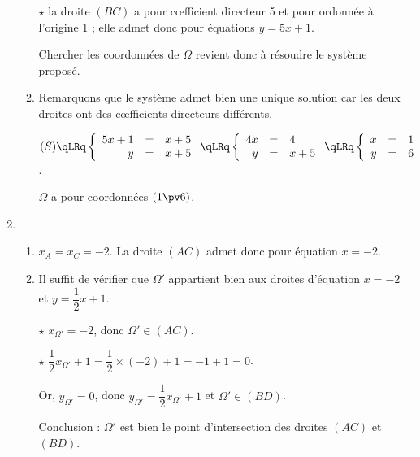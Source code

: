 \documentclass[12pt,french]{article}
\begin{document}
\begin{spacing}{1.2}
\begin{enumerate}[label=\arabic*.]
\begin{enumerate}[label=\alph*)]
	$\star$ la droite $(BC)$ a pour c\oe{}fficient directeur 5 et pour ordonnée à l'origine 1 ; elle admet donc pour équations $y=5x+1$.
	
	Chercher les coordonnées de $\Omega$ revient donc à résoudre le système proposé.
	
	\item %
	Remarquons que le système admet bien une unique solution car les deux droites ont des c\oe{}fficients directeurs différents.
	
	$(S)\qLRq \left\{\begin{array}{rcl}
	5x+1&=&x+5\\
	y&=&x+5
	\end{array}\right.
	\qLRq 
	\left\{\begin{array}{rcl}
	4x&=&4\\
	y&=&x+5
	\end{array}\right.
	\qLRq 
	\left\{\begin{array}{rcl}
	x&=&1\\
	y&=&6
	\end{array}\right.$.
	
	$\Omega$ a pour coordonnées $(1\pv 6)$.
	
	\end{enumerate}

\item %

	\begin{enumerate}[label=\alph*)]
	\item %
	$x_A=x_C=-2$. La droite $(AC)$ admet donc pour équation $x=-2$.
	
	\item %
	
	Il suffit de vérifier que $\Omega '$ appartient bien aux droites d'équation $x=-2$ et $y=\dfrac{1}{2}x+1$.
	
	$\star$ $x_{\Omega '}=-2$, donc $\Omega '\in (AC)$.
	
	$\star$ $\dfrac{1}{2}x_{\Omega '}+1=\dfrac{1}{2}\times (-2)+1=-1+1=0$.
	
	Or, $y_{\Omega '}=0$, donc $y_{\Omega '}=\dfrac{1}{2}x_{\Omega '}+1$ et $\Omega '\in (BD)$.
	
	Conclusion : $\Omega '$ est bien le point d'intersection des droites $(AC)$ et $(BD)$.
	

\end{enumerate}
\end{enumerate}
\end{spacing}
\end{document}
